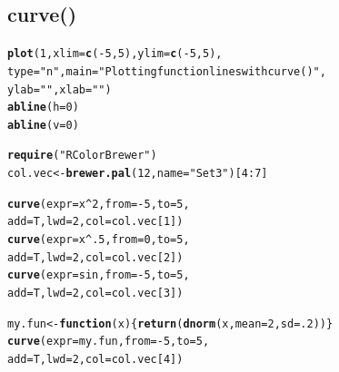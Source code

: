 \documentclass{tufte-book}\usepackage[]{graphicx}\usepackage[]{color}
\makeatletter
\newcommand{\hlnum}[1]{\textcolor[rgb]{0.686,0.059,0.569}{#1}}%
\newcommand{\hlstr}[1]{\textcolor[rgb]{0.192,0.494,0.8}{#1}}%
\newcommand{\hlopt}[1]{\textcolor[rgb]{0,0,0}{#1}}%
\newcommand{\hlstd}[1]{\textcolor[rgb]{0.345,0.345,0.345}{#1}}%
\newcommand{\hlkwa}[1]{\textcolor[rgb]{0.161,0.373,0.58}{\textbf{#1}}}%
\newcommand{\hlkwb}[1]{\textcolor[rgb]{0.69,0.353,0.396}{#1}}%
\newcommand{\hlkwc}[1]{\textcolor[rgb]{0.333,0.667,0.333}{#1}}%
\newcommand{\hlkwd}[1]{\textcolor[rgb]{0.737,0.353,0.396}{\textbf{#1}}}%
\newenvironment{kframe}{%
 \def\at@end@of@kframe{}%
 \ifinner\ifhmode%
  \def\at@end@of@kframe{\end{minipage}}%
  \begin{minipage}{\columnwidth}%
 \fi\fi%
 \def\FrameCommand##1{\hskip\@totalleftmargin \hskip-\fboxsep
 \colorbox{shadecolor}{##1}\hskip-\fboxsep
     \hskip-\linewidth \hskip-\@totalleftmargin \hskip\columnwidth}%
 \MakeFramed {\advance\hsize-\width
   \@totalleftmargin\z@ \linewidth\hsize
   \@setminipage}}%
 {\par\unskip\endMakeFramed%
 \at@end@of@kframe}
\newenvironment{knitrout}{}{} %
\makeatother
\begin{document}
\pagebreak
\subsection{curve()}

\begin{marginfigure}
\begin{tiny}
\begin{knitrout}
\color{fgcolor}\begin{kframe}
\begin{alltt}
\hlkwd{plot}\hlstd{(}\hlnum{1}\hlstd{,} \hlkwc{xlim} \hlstd{=} \hlkwd{c}\hlstd{(}\hlopt{-}\hlnum{5}\hlstd{,} \hlnum{5}\hlstd{),} \hlkwc{ylim} \hlstd{=} \hlkwd{c}\hlstd{(}\hlopt{-}\hlnum{5}\hlstd{,} \hlnum{5}\hlstd{),}
     \hlkwc{type} \hlstd{=} \hlstr{"n"}\hlstd{,} \hlkwc{main} \hlstd{=} \hlstr{"Plotting function lines with curve()"}\hlstd{,}
     \hlkwc{ylab} \hlstd{=} \hlstr{""}\hlstd{,} \hlkwc{xlab} \hlstd{=} \hlstr{""}\hlstd{)}
\hlkwd{abline}\hlstd{(}\hlkwc{h} \hlstd{=} \hlnum{0}\hlstd{)}
\hlkwd{abline}\hlstd{(}\hlkwc{v} \hlstd{=} \hlnum{0}\hlstd{)}

\hlkwd{require}\hlstd{(}\hlstr{"RColorBrewer"}\hlstd{)}
\hlstd{col.vec} \hlkwb{<-} \hlkwd{brewer.pal}\hlstd{(}\hlnum{12}\hlstd{,} \hlkwc{name} \hlstd{=} \hlstr{"Set3"}\hlstd{)[}\hlnum{4}\hlopt{:}\hlnum{7}\hlstd{]}

\hlkwd{curve}\hlstd{(}\hlkwc{expr} \hlstd{= x}\hlopt{^}\hlnum{2}\hlstd{,} \hlkwc{from} \hlstd{=} \hlopt{-}\hlnum{5}\hlstd{,} \hlkwc{to} \hlstd{=} \hlnum{5}\hlstd{,}
      \hlkwc{add} \hlstd{= T,} \hlkwc{lwd} \hlstd{=} \hlnum{2}\hlstd{,} \hlkwc{col} \hlstd{= col.vec[}\hlnum{1}\hlstd{])}
\hlkwd{curve}\hlstd{(}\hlkwc{expr} \hlstd{= x}\hlopt{^}\hlnum{.5}\hlstd{,} \hlkwc{from} \hlstd{=} \hlnum{0}\hlstd{,} \hlkwc{to} \hlstd{=} \hlnum{5}\hlstd{,}
      \hlkwc{add} \hlstd{= T,} \hlkwc{lwd} \hlstd{=} \hlnum{2}\hlstd{,} \hlkwc{col} \hlstd{= col.vec[}\hlnum{2}\hlstd{])}
\hlkwd{curve}\hlstd{(}\hlkwc{expr} \hlstd{= sin,} \hlkwc{from} \hlstd{=} \hlopt{-}\hlnum{5}\hlstd{,} \hlkwc{to} \hlstd{=} \hlnum{5}\hlstd{,}
      \hlkwc{add} \hlstd{= T,} \hlkwc{lwd} \hlstd{=} \hlnum{2}\hlstd{,} \hlkwc{col} \hlstd{= col.vec[}\hlnum{3}\hlstd{])}

\hlstd{my.fun} \hlkwb{<-} \hlkwa{function}\hlstd{(}\hlkwc{x}\hlstd{) \{}\hlkwd{return}\hlstd{(}\hlkwd{dnorm}\hlstd{(x,} \hlkwc{mean} \hlstd{=} \hlnum{2}\hlstd{,} \hlkwc{sd} \hlstd{=} \hlnum{.2}\hlstd{))\}}
\hlkwd{curve}\hlstd{(}\hlkwc{expr} \hlstd{= my.fun,} \hlkwc{from} \hlstd{=} \hlopt{-}\hlnum{5}\hlstd{,} \hlkwc{to} \hlstd{=} \hlnum{5}\hlstd{,}
      \hlkwc{add} \hlstd{= T,} \hlkwc{lwd} \hlstd{=} \hlnum{2}\hlstd{,} \hlkwc{col} \hlstd{= col.vec[}\hlnum{4}\hlstd{])}


\end{alltt}
\end{kframe}
\end{knitrout}
\end{tiny}
\end{marginfigure}
\end{document}
